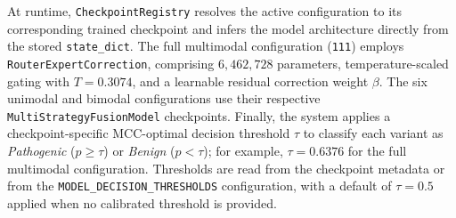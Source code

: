 \begin{table}[htbp]
    \centering
    \caption{The seven feature-ablation configurations supported by the \texttt{CheckpointRegistry}.}
    \label{tab:ablation_configs}
\end{table}

At runtime, \texttt{CheckpointRegistry} resolves the active configuration to its corresponding trained checkpoint and infers the model architecture directly from the stored \texttt{state\_dict}. The full multimodal configuration (\texttt{111}) employs \texttt{RouterExpertCorrection}, comprising $6{,}462{,}728$ parameters, temperature-scaled gating with $T = 0.3074$, and a learnable residual correction weight $\beta$. The six unimodal and bimodal configurations use their respective \texttt{MultiStrategyFusionModel} checkpoints. Finally, the system applies a checkpoint-specific MCC-optimal decision threshold $\tau$ to classify each variant as \textit{Pathogenic} ($p \geq \tau$) or \textit{Benign} ($p < \tau$); for example, $\tau = 0.6376$ for the full multimodal configuration. Thresholds are read from the checkpoint metadata or from the \texttt{MODEL\_DECISION\_THRESHOLDS} configuration, with a default of $\tau = 0.5$ applied when no calibrated threshold is provided.


